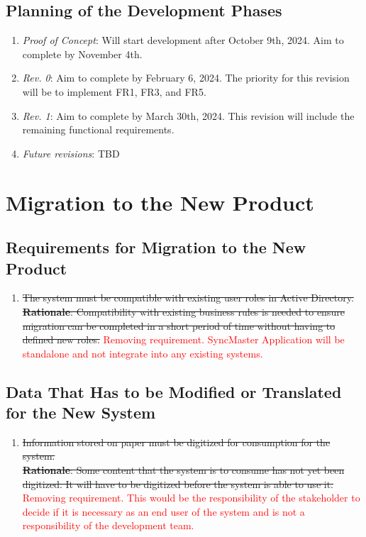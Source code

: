 \documentclass[12pt]{article}
\begin{document}
\subsection{Planning of the Development Phases}
\begin{enumerate}
  \item \textit{Proof of Concept}: Will start development after
    October 9th, 2024. Aim to complete by November 4th.
  \item \textit{Rev. 0}: Aim to complete by February 6, 2024. The priority for this revision will be to implement FR1, FR3, and FR5.
  \item \textit{Rev. 1}: Aim to complete by March 30th, 2024. This revision will include the remaining functional requirements.
  \item \textit{Future revisions}: TBD
\end{enumerate}

\section{Migration to the New Product}
\subsection{Requirements for Migration to the New Product}
\begin{enumerate} [{MI-NP}1.]
  \item \sout{The system must be compatible with existing user roles in Active
    Directory.\\
    \textbf{Rationale}: Compatibility with existing business rules is needed
    to ensure migration can be completed in a short period of time without
    having to defined new roles.}
    \textcolor{red}{Removing requirement. SyncMaster Application will be standalone and not integrate into any existing systems.}
\end{enumerate}

\subsection{Data That Has to be Modified or Translated for the New System}
\begin{enumerate} [{MI-TR}1.]
  \item \sout{Information stored on paper must be digitized for consumption for the
    system.\\
    \textbf{Rationale}: Some content that the system is to consume has not yet
    been digitized. It will have to be digitized before the system is able to
    use it.}
    \textcolor{red}{Removing requirement. This would be the responsibility of the stakeholder to decide if it is necessary as
    an end user of the system and is not a responsibility of the development team.}
\end{enumerate}
\end{document}
